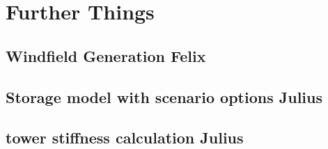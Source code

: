 \chapter{Further Things}
\section{Windfield Generation Felix}

\section{Storage model with scenario options Julius}

\section{tower stiffness calculation Julius}

